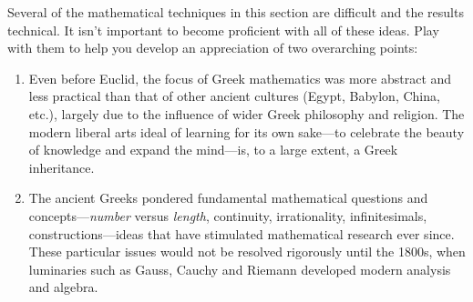 Several of the mathematical techniques in this section are difficult and the results technical. It isn't important to become proficient with all of these ideas. Play with them to help you develop an appreciation of two overarching points:
\begin{enumerate}
  \item Even before Euclid, the focus of Greek mathematics was more abstract and less practical than that of other ancient cultures (Egypt, Babylon, China, etc.), largely due to the influence of wider Greek philosophy and religion. The modern liberal arts ideal of learning for its own sake---to celebrate the beauty of knowledge and expand the mind---is, to a large extent, a Greek inheritance. 
  \item The ancient Greeks pondered fundamental mathematical questions and concepts---\emph{number} versus \emph{length}, continuity, irrationality, infinitesimals, constructions---ideas that have stimulated mathematical research ever since. These particular issues would not be resolved rigorously until the 1800s, when luminaries such as Gauss, Cauchy and Riemann developed modern analysis and algebra.
\end{enumerate}


\clearpage


